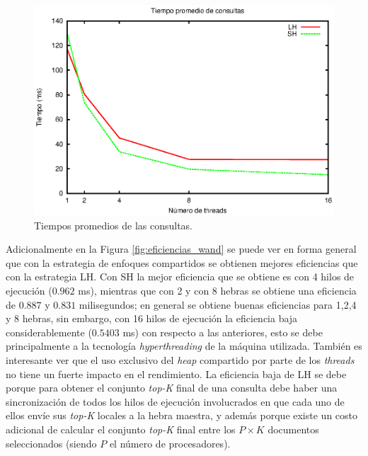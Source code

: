 \begin{figure}[!ht]
\centering
\includegraphics[scale=.75]{images/tiempos_wand.eps}
\caption{Tiempos promedios de las consultas.}
\label{fig:tiempos_wand}
\end{figure}

Adicionalmente en la Figura \ref{fig:eficiencias_wand} se puede ver en forma general que con la estrategia de enfoques compartidos se obtienen mejores eficiencias que con la estrategia LH. Con SH la mejor eficiencia que se obtiene es con 4 hilos de ejecución ($0.962$ ms), mientras que con 2 y con 8 hebras se obtiene una eficiencia de $0.887$ y $0.831$ milisegundos; en general se obtiene buenas eficiencias para 1,2,4 y 8 hebras, sin embargo, con 16 hilos de ejecución la eficiencia baja considerablemente ($0.5403$ ms) con respecto a las anteriores, esto se debe principalmente a la tecnología \textit{hyperthreading} de la máquina utilizada. También es interesante ver que el uso exclusivo del \textit{heap} compartido por parte de los \textit{threads} no tiene un fuerte impacto en el rendimiento. La eficiencia baja de LH se debe porque para obtener el conjunto \textit{top-K} final de una consulta debe haber una sincronización de todos los hilos de ejecución involucrados en que cada uno de ellos envíe sus \textit{top-K} locales a la hebra maestra, y además porque existe un costo adicional de calcular el conjunto \textit{top-K} final entre los $P \times K$ documentos seleccionados (siendo $P$ el número de procesadores). 
                     

